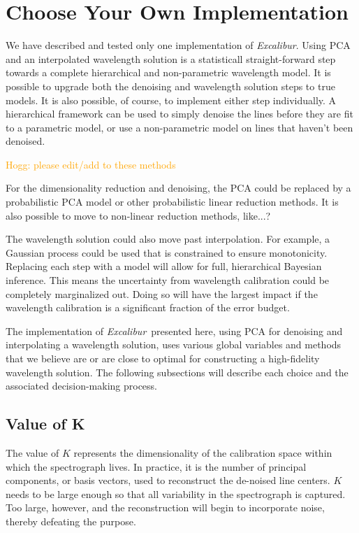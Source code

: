 \documentclass[modern]{aastex63}
\newcommand{\project}[1]{\textsl{#1}}
\newcommand{\name}{\project{Excalibur}}
\newcommand{\lz}[1]{\textcolor{orange}{#1}}
\begin{document}
\section{Choose Your Own Implementation} \label{sec:choices}
We have described and tested only one implementation of \name.  Using PCA and an interpolated wavelength solution is a statisticall straight-forward step towards a complete hierarchical and non-parametric wavelength model.  It is possible to upgrade both the denoising and wavelength solution steps to true models.  It is also possible, of course, to implement either step individually.  A hierarchical framework can be used to simply denoise the lines before they are fit to a parametric model, or use a non-parametric model on lines that haven't been denoised.

\lz{Hogg: please edit/add to these methods}

For the dimensionality reduction and denoising, the PCA could be replaced by a probabilistic PCA model or other probabilistic linear reduction methods.  It is also possible to move to non-linear reduction methods, like...?

The wavelength solution could also move past interpolation.  For example, a Gaussian process could be used that is constrained to ensure monotonicity.  Replacing each step with a model will allow for full, hierarchical Bayesian inference.  This means the uncertainty from wavelength calibration could be completely marginalized out.  Doing so will have the largest impact if the wavelength calibration is a significant fraction of the error budget.

The implementation of \name\ presented here, using PCA for denoising and interpolating a wavelength solution, uses various global variables and methods that we believe are or are close to optimal for constructing a high-fidelity wavelength solution.  The following subsections will describe each choice and the associated decision-making process.

\subsection{Value of K}
\label{sec:choice_k}
The value of $K$ represents the dimensionality of the calibration space within which the spectrograph lives.  In practice, it is the number of principal components, or basis vectors, used to reconstruct the de-noised line centers.  $K$ needs to be large enough so that all variability in the spectrograph is captured.  Too large, however, and the reconstruction will begin to incorporate noise, thereby defeating the purpose.
\end{document}

